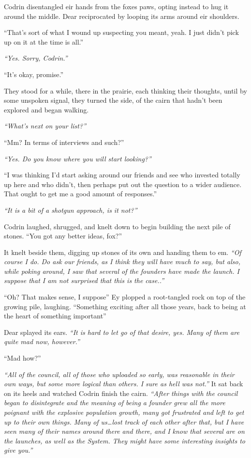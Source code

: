 Codrin disentangled eir hands from the foxes paws, opting instead to hug it around the middle. Dear reciprocated by looping its arms around eir shoulders.

``That's sort of what I wound up suspecting you meant, yeah. I just didn't pick up on it at the time is all.''

\emph{``Yes. Sorry, Codrin.''}

``It's okay, promise.''

They stood for a while, there in the prairie, each thinking their thoughts, until by some unspoken signal, they turned the side, of the cairn that hadn't been explored and began walking.

\emph{``What's next on your list?''}

``Mm? In terms of interviews and such?''

\emph{``Yes. Do you know where you will start looking?''}

``I was thinking I'd start asking around our friends and see who invested totally up here and who didn't, then perhaps put out the question to a wider audience. That ought to get me a good amount of responses.''

\emph{``It is a bit of a shotgun approach, is it not?''}

Codrin laughed, shrugged, and knelt down to begin building the next pile of stones. ``You got any better ideas, fox?''

It knelt beside them, digging up stones of its own and handing them to em. \emph{``Of course I do. Do ask our friends, as I think they will have much to say, but also, while poking around, I saw that several of the founders have made the launch. I suppose that I am not surprised that this is the case..''}

``Oh? That makes sense, I suppose'' Ey plopped a root-tangled rock on top of the growing pile, laughing. ``Something exciting after all those years, back to being at the heart of something important''

Dear splayed its ears. \emph{``It is hard to let go of that desire, yes. Many of them are quite mad now, however.''}

``Mad how?''

\emph{``All of the council, all of those who uploaded so early, was reasonable in their own ways, but some more logical than others. I sure as hell was not.''} It sat back on its heels and watched Codrin finish the cairn. \emph{``After things with the council began to disintegrate and the meaning of being a founder grew all the more poignant with the explosive population growth, many got frustrated and left to get up to their own things. Many of us\ldots lost track of each other after that, but I have seen many of their names around there and there, and I know that several are on the launches, as well as the System. They might have some interesting insights to give you.''}

